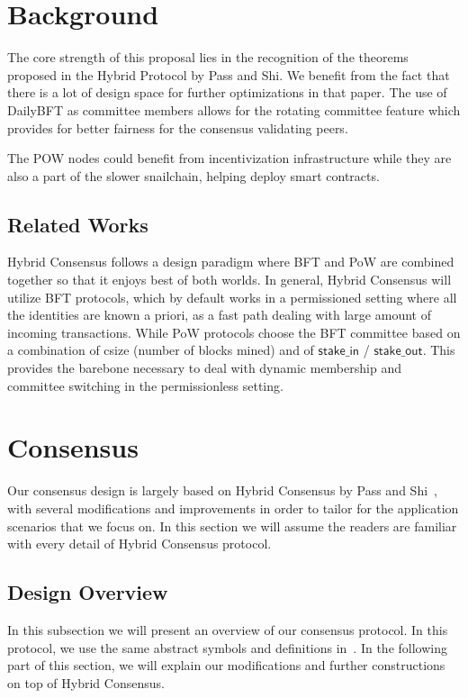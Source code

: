 \documentclass[9pt,oneside]{amsart}
\begin{document}
\begin{multicols}{2}
\section{Background}

The core strength of this proposal lies in the recognition of the theorems proposed in the Hybrid Protocol\cite{pass2017hybrid}
by Pass and Shi. We benefit from the fact that there is a lot of design space for further optimizations in that paper.
The use of DailyBFT as committee members allows for the rotating committee feature which provides for better fairness for
the consensus validating peers.

The POW nodes could benefit from incentivization infrastructure while they are also a part of the slower snailchain, helping
deploy smart contracts.

\subsection{Related Works}

Hybrid Consensus follows a design paradigm where BFT and PoW are combined together so that it enjoys best of both worlds. In general,
Hybrid Consensus will utilize BFT protocols, which by default works in a permissioned setting where all the identities are known a priori,
as a fast path dealing with large amount of incoming transactions. While PoW protocols choose the BFT committee based on a combination of
csize (number of blocks mined) and of $\mathsf{stake\_in}$ / $\mathsf{stake\_out}$. This provides the barebone necessary to deal with
dynamic membership and committee switching in the permissionless setting.

\section{Consensus}
Our consensus design is largely based on Hybrid Consensus by Pass and Shi~\cite{pass2017hybrid}, with several modifications
and improvements in order to tailor for the application scenarios that we focus on. In this section we will assume the readers
are familiar with every detail of Hybrid Consensus protocol.

\subsection{Design Overview}

In this subsection we will present an overview of our consensus protocol. In this protocol, we use the same abstract symbols and definitions
in~\cite{pass2017hybrid}. In the following part of this section, we will explain our modifications and further constructions on top of Hybrid Consensus.


\end{multicols}
\end{document}

